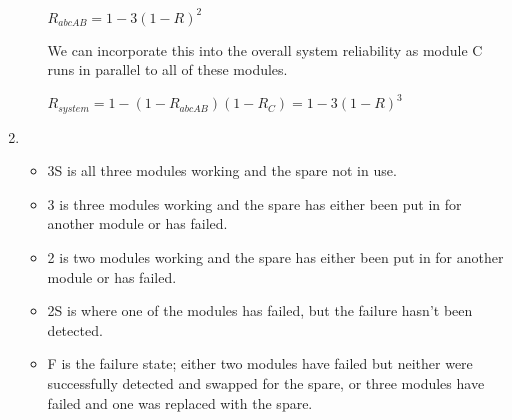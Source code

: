 \documentclass[a4paper,12pt]{article}
\begin{document}
\begin{enumerate}
\begin{enumerate}
                    $R_{abcAB} = 1 - 3(1 - R)^2$

                    We can incorporate this into the overall system reliability as module C runs in parallel to all of these modules.

                    $R_{system} = 1 - (1 - R_{abcAB})(1 - R_C) = 1 - 3(1 - R)^3$

            \end{enumerate}

        \item
            \begin{itemize}
                \item 3S is all three modules working and the spare not in use.
                \item 3 is three modules working and the spare has either been put in for another module or has failed.
                \item 2 is two modules working and the spare has either been put in for another module or has failed.
                \item 2S is where one of the modules has failed, but the failure hasn't been detected.
                \item F is the failure state; either two modules have failed but neither were successfully detected and swapped for the spare, or three modules have failed and one was replaced with the spare.
            \end{itemize}

            \begin{center}
            \end{center}


\end{enumerate}
\end{document}
